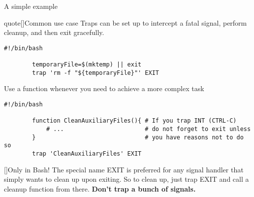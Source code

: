 \begin{frame}[fragile]{A simple example}
    \vspace{-4mm}
    \begin{varblock}{quote}[\textwidth]{Common use case}
        \normalsize\textnormal{Traps can be set up to intercept a fatal signal, perform cleanup, and then exit gracefully.}
    \end{varblock}
    \begin{lstlisting}[style=MyBash, emph={[7]temporaryFile}, belowskip=-5mm]
        #!/bin/bash
        
        temporaryFile=$(mktemp) || exit
        trap 'rm -f "${temporaryFile}"' EXIT
    \end{lstlisting}
    Use a function whenever you need to achieve a more complex task
    \begin{lstlisting}[style=MyBash, emph={[7]temporaryFile}, aboveskip=2mm, belowskip=-5mm, xleftmargin=2mm, xrightmargin=3mm, firstnumber=5]
        #!/bin/bash
        
        function CleanAuxiliaryFiles(){ # If you trap INT (CTRL-C)
            # ...                       # do not forget to exit unless
        }                               # you have reasons not to do so
        trap 'CleanAuxiliaryFiles' EXIT
    \end{lstlisting}
    \small
    \begin{varblock}{}[\textwidth]{Only in Bash!}
        The special name EXIT is preferred for any signal handler that simply wants to clean up upon exiting.
        So to clean up, just trap EXIT and call a cleanup function from there. \textbf{Don't trap a bunch of signals.}
    \end{varblock}
\end{frame}
